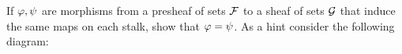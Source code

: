 \documentclass[12pt]{memoir}
\begin{document}
\begin{Ej}[2.4.C Vakil]
    If $\varphi,\psi$ are morphisms from a presheaf of sets $\mathcal{F}$ to a sheaf of sets $\mathcal{G}$ that induce the same maps on each stalk, show that $\varphi=\psi$. As a hint consider the following diagram:
    \begin{center}
    \end{center}
\end{Ej}

\end{document}
